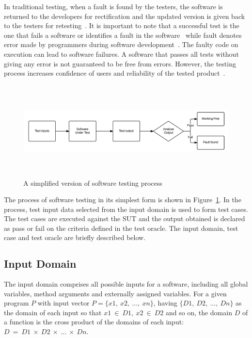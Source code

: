 In traditional testing, when a fault is found by the testers, the software is returned to the developers for rectification and the updated version is given back to the testers for retesting~\cite{chen2005adaptive}. It is important to note that a successful test is the one that fails a software or identifies a fault in the software~\cite{myers2011art} while fault denotes error made by programmers during software development~\cite{american1984}. The faulty code on execution can lead to software failures. A software that passes all tests without giving any error is not guaranteed to be free from errors. However, the testing process increases confidence of users and reliability of the tested product~\cite{dahl1972structured}. 

\bigskip
\bigskip
\begin{figure}[h]
	\centering
	\centerline{\includegraphics[width=16cm, height=5cm]{chapter2/softwareTesting.png}}
	\bigskip
	\caption{A simplified version of software testing process}
	\label{fig:softwareTestingParts_2}
\end{figure}
\bigskip
\bigskip

The process of software testing in its simplest form is shown in Figure~\ref{fig:softwareTestingParts_2}. In the process, test input data selected from the input domain is used to form test cases. The test cases are executed against the SUT and the output obtained is declared as pass or fail on the criteria defined in the test oracle. The input domain, test case and test oracle are briefly described below.

\subsection{Input Domain} 
The input domain comprises all possible inputs for a software, including all global variables, method arguments and externally assigned variables. For a given program $P$ with input vector $ P =\{x1,~x2,~. . . ,~xn\}$, having $\{D1,~D2,~. . . ,~Dn\}$ as the domain of each input so that $x1~\in~D1,~x2~\in~D2$ and so on, the domain $D$ of a function is the cross product of the domains of each input: $D~=~D1~\times~D2~\times~. . .~\times~Dn$.

